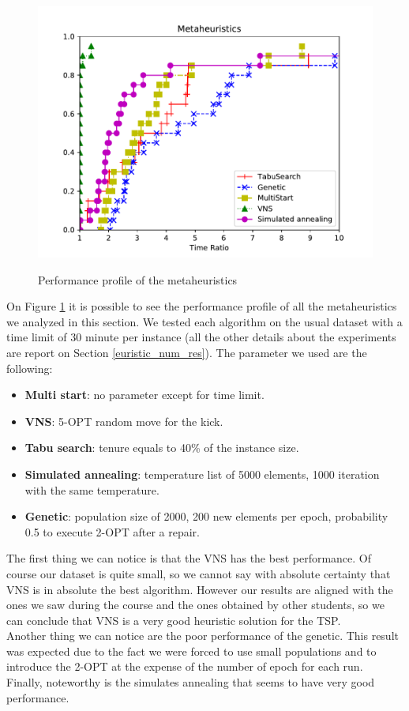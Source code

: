 \begin{figure}[h!]
\centering
	\includegraphics[scale=0.9]{media/metaheuristics.pdf} \\
	\caption{Performance profile of the metaheuristics}
	\label{fig:metaheuristics}
\end{figure}

On Figure \ref{fig:metaheuristics} it is possible to see the performance profile of all the metaheuristics we analyzed in this section. We tested each algorithm on the usual dataset with a time limit of 30 minute per instance (all the other details about the experiments are report on Section \ref{euristic_num_res}). The parameter we used are the following:

\begin{itemize}
	\item \textbf{Multi start}: no parameter except for time limit.
	\item \textbf{VNS}: 5-OPT random move for the kick.
	\item \textbf{Tabu search}: tenure equals to 40\% of the instance size.
	\item \textbf{Simulated annealing}: temperature list of 5000 elements, 1000 iteration with the same temperature.
	\item \textbf{Genetic}: population size of 2000, 200 new elements per epoch, probability 0.5 to execute 2-OPT after a repair. 
\end{itemize}

\noindent The first thing we can notice is that the VNS has the best performance. Of course our dataset is quite small, so we cannot say with absolute certainty that VNS is in absolute the best algorithm. However our results are aligned with the ones we saw during the course and the ones obtained by other students, so we can conclude that VNS is a very good heuristic solution for the TSP. \\
Another thing we can notice are the poor performance of the genetic. This result was expected due to the fact we were forced to use small populations and to introduce the 2-OPT at the expense of the number of epoch for each run. \\
Finally, noteworthy is the simulates annealing that seems to have very good performance.
